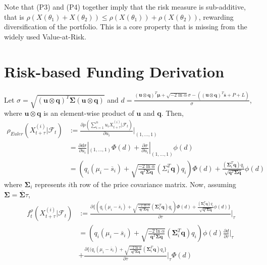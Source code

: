 \documentclass{article}
\begin{document}
\begin{appendices}
Note that (P3) and (P4) together imply that the risk measure is sub-additive, that is $\rho(X(\theta_1)+X(\theta_2)) \leq \rho(X(\theta_1))+\rho(X(\theta_2))$, rewarding diversification of the portfolio. This is a core property that is missing from the widely used Value-at-Risk.

\section{Risk-based Funding Derivation} \label{app2}
Let $\sigma = \sqrt{(\mathbf{u}\otimes\mathbf{q})^T\boldsymbol{\Sigma}(\mathbf{u}\otimes\mathbf{q})}$ and $d = \frac{(\mathbf{u}\otimes\mathbf{q})^T\boldsymbol{\mu}+\sqrt{-2\ln\alpha}\sigma-((\mathbf{u}\otimes\mathbf{q})^T\overline{\mathbf{s}}+P+L)}{\sigma}$, where $\mathbf{u}\otimes\mathbf{q}$ is an element-wise product of $\mathbf{u}$ and $\mathbf{q}$. Then, 
\begin{align*}
    \rho_{Euler}(X_{t+\tau}^{(i)}|\mathcal{F}_{t})
    &:= \frac{\partial\rho(\sum_{i=1}^n u_i X_{t+\tau}^{(i)}|\mathcal{F}_t)}{\partial u_i}|_{(1,\dots,1)} \\
    &= \frac{\partial d\sigma}{\partial u_i}|_{(1,\ldots,1)}\Phi(d)+\frac{\partial \sigma}{\partial u_i}|_{(1,\dots,1)}\phi(d)\\
    &= (q_i(\mu_i-\overline{s}_i)+\sqrt{\frac{-2\ln\alpha}{\mathbf{q}^T\boldsymbol{\Sigma}\mathbf{q}}}(\Sigma_i^T\mathbf{q})q_i)\Phi(d)+\frac{(\boldsymbol{\Sigma}_i^T\mathbf{q})q_i}{\sqrt{\mathbf{q}^T\boldsymbol{\Sigma}\mathbf{q}}}\phi(d)
\end{align*}
where $\boldsymbol{\Sigma}_i$ represents $i$th row of the price covariance matrix. Now, assuming $\boldsymbol{\Sigma} = \overline{\boldsymbol{\Sigma}}\tau$, 
\begin{align*}
    f^\rho_t(X^{(i)}_{t+\tau}|\mathcal{F}_t) 
    &:= \frac{\partial\{(q_i(\mu_i-\overline{s}_i)+\sqrt{\frac{-2\ln\alpha}{\mathbf{q}^T\boldsymbol{\Sigma}\mathbf{q}}}(\boldsymbol{\Sigma}_i^T\mathbf{q})q_i)\Phi(d)+\frac{(\boldsymbol{\Sigma}_i^T\mathbf{q})q_i}{\sqrt{\mathbf{q}^T\boldsymbol{\Sigma}\mathbf{q}}}\phi(d)\}}{\partial \tau}|_\tau\\
    &= (q_i(\mu_i-\overline{s}_i)+\sqrt{\frac{-2\ln\alpha}{\mathbf{q}^T\boldsymbol{\Sigma}\mathbf{q}}}(\boldsymbol{\Sigma}_i^T\mathbf{q})q_i)\phi(d)\frac{\partial d}{\partial \tau}|_\tau \\
    &+ \frac{\partial\{(q_i(\mu_i-\overline{s}_i)+\sqrt{\frac{-2\ln\alpha}{\mathbf{q}^T\boldsymbol{\Sigma}\mathbf{q}}}(\boldsymbol{\Sigma}_i^T\mathbf{q})q_i\}}{\partial \tau}|_\tau\Phi(d)\\

\end{align*}
\end{appendices}
\end{document}

